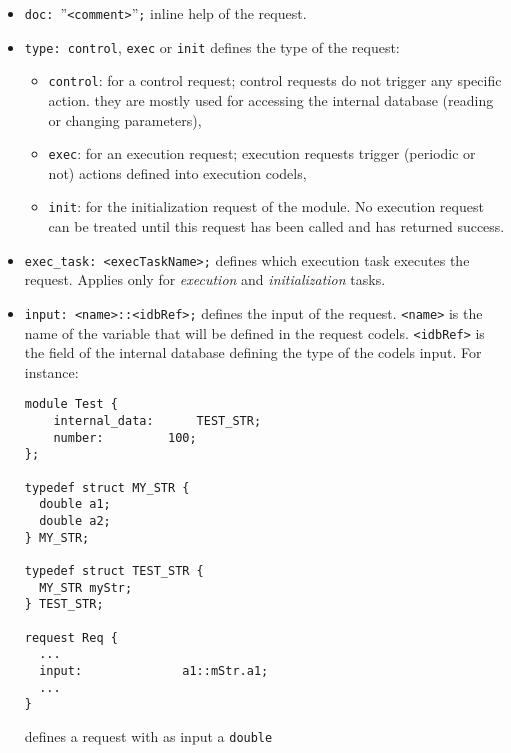 \begin{itemize}
\item[]{\tt doc: }''{\tt<comment>}''{\tt;} inline help of the request.
\item[]{\tt type:  control}, {\tt exec} or {\tt init} defines the type of the request:
  \begin{itemize}
  \item {\tt control}: for a control request; control requests do not
    trigger any specific action. they are mostly used for accessing the
    internal database (reading or changing parameters),
  \item {\tt exec}: for an execution request; execution requests trigger
    (periodic or not) actions defined into execution codels,
  \item {\tt init}: for the initialization request of the module. No
    execution request can be treated until this request has been
    called and has returned success.
  \end{itemize}

\item[]{\tt exec\_task:  <execTaskName>;} defines which execution task
executes the request. Applies only for {\em execution} and {\em
  initialization} tasks.

\item[]\texttt{input: <name>::<idbRef>;} defines the input of the
  request. \texttt{<name>} is the name of the variable that will be
  defined in the request codels. \texttt{<idbRef>} is the field of the
  internal database defining the type of the codels input. For instance:\\
\begin{verbatim}
module Test {
    internal_data:	    TEST_STR;
    number:		    100;
}; 

typedef struct MY_STR {
  double a1;
  double a2;
} MY_STR;

typedef struct TEST_STR {
  MY_STR myStr;
} TEST_STR;

request Req {
  ...
  input:              a1::mStr.a1;
  ...
}
\end{verbatim}
defines a request with as input a {\tt double}\\


\end{itemize}
